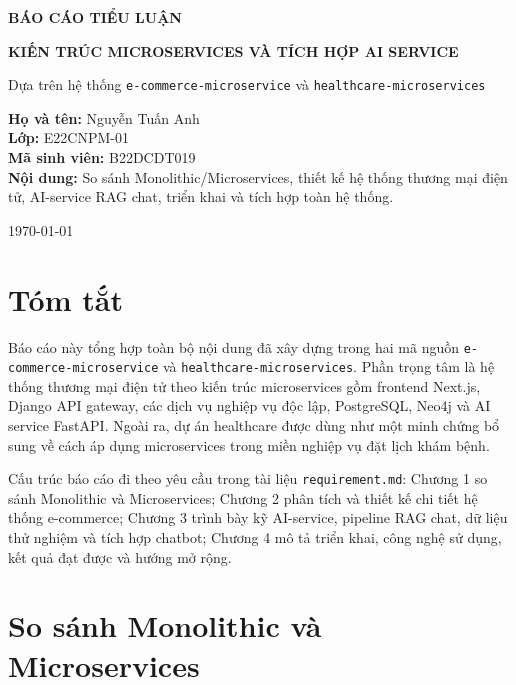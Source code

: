 \documentclass[12pt,a4paper]{report}
\begin{document}
\begin{titlepage}
  \centering
  {\Large \textbf{BÁO CÁO TIỂU LUẬN}\par}
  \vspace{1.2cm}
  {\Huge \textbf{KIẾN TRÚC MICROSERVICES VÀ TÍCH HỢP AI SERVICE}\par}
  \vspace{0.6cm}
  {\Large Dựa trên hệ thống \texttt{e-commerce-microservice} và \texttt{healthcare-microservices}\par}
  \vfill
  \begin{flushleft}
    \textbf{Họ và tên:} Nguyễn Tuấn Anh\\[0.35cm]
    \textbf{Lớp:} E22CNPM-01\\[0.35cm]
    \textbf{Mã sinh viên:} B22DCDT019\\[0.35cm]
    \textbf{Nội dung:} So sánh Monolithic/Microservices, thiết kế hệ thống thương mại điện tử, AI-service RAG chat, triển khai và tích hợp toàn hệ thống.
  \end{flushleft}
  \vfill
  {\large \today\par}
\end{titlepage}

\tableofcontents
\newpage

\chapter*{Tóm tắt}
Báo cáo này tổng hợp toàn bộ nội dung đã xây dựng trong hai mã nguồn \texttt{e-commerce-microservice} và \texttt{healthcare-microservices}. Phần trọng tâm là hệ thống thương mại điện tử theo kiến trúc microservices gồm frontend Next.js, Django API gateway, các dịch vụ nghiệp vụ độc lập, PostgreSQL, Neo4j và AI service FastAPI. Ngoài ra, dự án healthcare được dùng như một minh chứng bổ sung về cách áp dụng microservices trong miền nghiệp vụ đặt lịch khám bệnh.

Cấu trúc báo cáo đi theo yêu cầu trong tài liệu \texttt{requirement.md}: Chương 1 so sánh Monolithic và Microservices; Chương 2 phân tích và thiết kế chi tiết hệ thống e-commerce; Chương 3 trình bày kỹ AI-service, pipeline RAG chat, dữ liệu thử nghiệm và tích hợp chatbot; Chương 4 mô tả triển khai, công nghệ sử dụng, kết quả đạt được và hướng mở rộng.

\chapter{So sánh Monolithic và Microservices}
\end{document}
